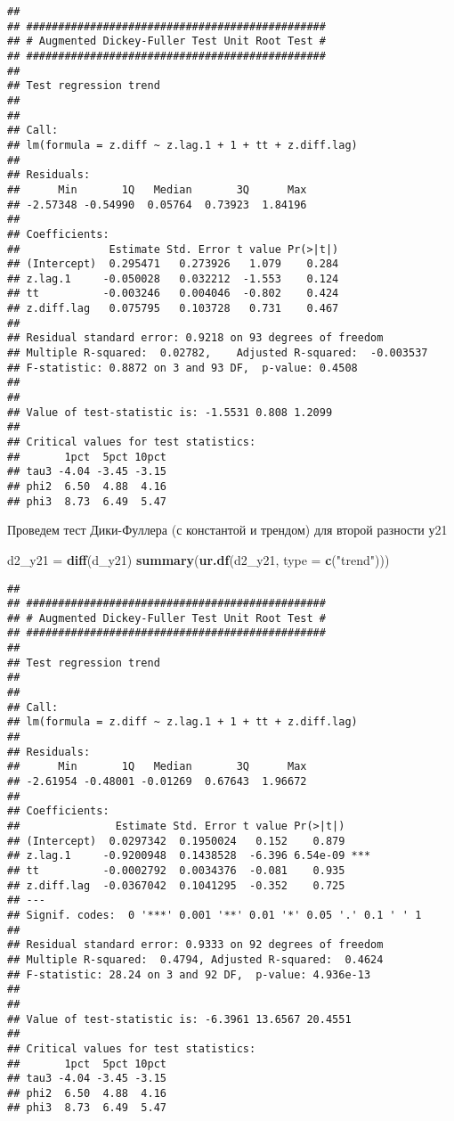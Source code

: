 \documentclass[
]{article}
\newenvironment{Shaded}{\begin{snugshade}}{\end{snugshade}}
\newcommand{\AttributeTok}[1]{\textcolor[rgb]{0.13,0.29,0.53}{#1}}
\newcommand{\FunctionTok}[1]{\textcolor[rgb]{0.13,0.29,0.53}{\textbf{#1}}}
\newcommand{\NormalTok}[1]{#1}
\newcommand{\OtherTok}[1]{\textcolor[rgb]{0.56,0.35,0.01}{#1}}
\newcommand{\StringTok}[1]{\textcolor[rgb]{0.31,0.60,0.02}{#1}}
\begin{document}
\begin{verbatim}
## 
## ############################################### 
## # Augmented Dickey-Fuller Test Unit Root Test # 
## ############################################### 
## 
## Test regression trend 
## 
## 
## Call:
## lm(formula = z.diff ~ z.lag.1 + 1 + tt + z.diff.lag)
## 
## Residuals:
##      Min       1Q   Median       3Q      Max 
## -2.57348 -0.54990  0.05764  0.73923  1.84196 
## 
## Coefficients:
##              Estimate Std. Error t value Pr(>|t|)
## (Intercept)  0.295471   0.273926   1.079    0.284
## z.lag.1     -0.050028   0.032212  -1.553    0.124
## tt          -0.003246   0.004046  -0.802    0.424
## z.diff.lag   0.075795   0.103728   0.731    0.467
## 
## Residual standard error: 0.9218 on 93 degrees of freedom
## Multiple R-squared:  0.02782,    Adjusted R-squared:  -0.003537 
## F-statistic: 0.8872 on 3 and 93 DF,  p-value: 0.4508
## 
## 
## Value of test-statistic is: -1.5531 0.808 1.2099 
## 
## Critical values for test statistics: 
##       1pct  5pct 10pct
## tau3 -4.04 -3.45 -3.15
## phi2  6.50  4.88  4.16
## phi3  8.73  6.49  5.47
\end{verbatim}

Проведем тест Дики-Фуллера (с константой и трендом) для второй разности
у21

\begin{Shaded}
\begin{Highlighting}[]
\NormalTok{d2\_y21 }\OtherTok{=} \FunctionTok{diff}\NormalTok{(d\_y21)}
\FunctionTok{summary}\NormalTok{(}\FunctionTok{ur.df}\NormalTok{(d2\_y21, }\AttributeTok{type =} \FunctionTok{c}\NormalTok{(}\StringTok{"trend"}\NormalTok{)))}
\end{Highlighting}
\end{Shaded}

\begin{verbatim}
## 
## ############################################### 
## # Augmented Dickey-Fuller Test Unit Root Test # 
## ############################################### 
## 
## Test regression trend 
## 
## 
## Call:
## lm(formula = z.diff ~ z.lag.1 + 1 + tt + z.diff.lag)
## 
## Residuals:
##      Min       1Q   Median       3Q      Max 
## -2.61954 -0.48001 -0.01269  0.67643  1.96672 
## 
## Coefficients:
##               Estimate Std. Error t value Pr(>|t|)    
## (Intercept)  0.0297342  0.1950024   0.152    0.879    
## z.lag.1     -0.9200948  0.1438528  -6.396 6.54e-09 ***
## tt          -0.0002792  0.0034376  -0.081    0.935    
## z.diff.lag  -0.0367042  0.1041295  -0.352    0.725    
## ---
## Signif. codes:  0 '***' 0.001 '**' 0.01 '*' 0.05 '.' 0.1 ' ' 1
## 
## Residual standard error: 0.9333 on 92 degrees of freedom
## Multiple R-squared:  0.4794, Adjusted R-squared:  0.4624 
## F-statistic: 28.24 on 3 and 92 DF,  p-value: 4.936e-13
## 
## 
## Value of test-statistic is: -6.3961 13.6567 20.4551 
## 
## Critical values for test statistics: 
##       1pct  5pct 10pct
## tau3 -4.04 -3.45 -3.15
## phi2  6.50  4.88  4.16
## phi3  8.73  6.49  5.47
\end{verbatim}
\end{document}
